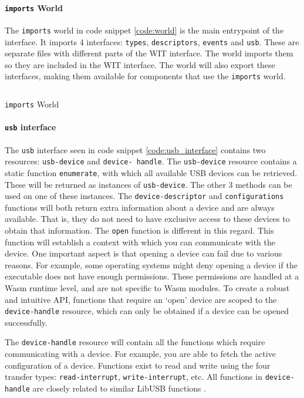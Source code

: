 \paragraph{\texttt{imports} World}
The \texttt{imports} world in code snippet \ref{code:world} is the main entrypoint of the interface. It imports 4 interfaces: \texttt{types}, \texttt{descriptors}, \texttt{events} and \texttt{usb}. These are separate files with different parts of the WIT interface. The world imports them so they are included in the WIT interface. The world will also export these interfaces, making them available for components that use the \texttt{imports} world.\\

\begin{code}
\inputminted[breaklines]{text}{WIT/wit/world.wit}
\caption{\texttt{imports} World}
\label{code:world}
\end{code}

\paragraph{\texttt{usb} interface}
The \texttt{usb} interface seen in code snippet \ref{code:usb_interface} contains two resources: \texttt{usb-device} and \texttt{device- handle}. The \texttt{usb-device} resource contains a static function \texttt{enumerate}, with which all available USB devices can be retrieved. These will be returned as instances of \texttt{usb-device}. The other 3 methods can be used on one of these instances. The \texttt{device-descriptor} and \texttt{configurations} functions will both return extra information about a device and are always available. That is, they do not need to have exclusive access to these devices to obtain that information. The \texttt{open} function is different in this regard. This function will establish a context with which you can communicate with the device. One important aspect is that opening a device can fail due to various reasons. For example, some operating systems might deny opening a device if the executable does not have enough permissions. These permissions are handled at a \acrshort{Wasm} runtime level, and are not specific to \acrshort{Wasm} modules. To create a robust and intuitive API, functions that require an `open' device are scoped to the \texttt{device-handle} resource, which can only be obtained if a device can be opened successfully.

The \texttt{device-handle} resource will contain all the functions which require communicating with a device. For example, you are able to fetch the active configuration of a device. Functions exist to read and write using the four transfer types: \texttt{read-interrupt}, \texttt{write-interrupt}, etc. All functions in \texttt{device-handle} are closely related to similar LibUSB functions \cite{libusb_docs}. \\


